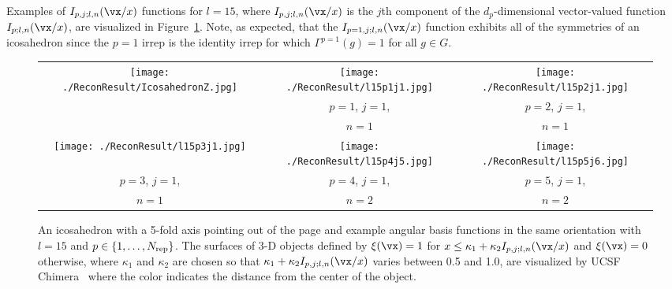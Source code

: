 \par
Examples of $I_{p,j;l,n}(\vx/x)$ functions for $l=15$, where
$I_{p,j;l,n}(\vx/x)$ is the $j$th component of the $d_p$-dimensional
vector-valued function $I_{p;l,n}(\vx/x)$, are visualized in
Figure~\ref{fig:irredrep}.
Note, as expected, that the $I_{p=1,j;l,n}(\vx/x)$ function exhibits all of
the symmetries of an icosahedron since the $p=1$ irrep is the identity
irrep for which $\Gamma^{p=1}(g)=1$ for all $g\in G$.
\begin{figure}[h!]
\begin{center}
\begin{tabular}{ccc}
\texttt{[image: ./ReconResult/IcosahedronZ.jpg]}
&
\texttt{[image: ./ReconResult/l15p1j1.jpg]}
&
\texttt{[image: ./ReconResult/l15p2j1.jpg]}
\\
&
$p=1$, $j=1$,
&
$p=2$, $j=1$,
\\
&
$n=1$
&
$n=1$
\\
\texttt{[image: ./ReconResult/l15p3j1.jpg]}
&
\texttt{[image: ./ReconResult/l15p4j5.jpg]}
&
\texttt{[image: ./ReconResult/l15p5j6.jpg]}
\\
$p=3$, $j=1$,
&
$p=4$, $j=1$,
&
$p=5$, $j=1$,
\\
$n=1$
&
$n=2$
&
$n=2$
\end{tabular}
\end{center}
\vspace*{-.1in}
\caption{
\label{fig:irredrep}
An icosahedron with a 5-fold axis pointing out of the page and example
angular basis functions in the same orientation with $l=15$ and
$p\in\{1,\dots,N_{\rm rep}\}$.
The surfaces of 3-D objects defined by $\xi(\vx)=1$ for $x\le
\kappa_1+\kappa_2 I_{p,j;l,n}(\vx/x)$ and $\xi(\vx)=0$ otherwise, where $\kappa_1$
and $\kappa_2$ are chosen so that
$\kappa_1+\kappa_2 I_{p,j;l,n}(\vx/x)$ varies between 0.5 and 1.0,
are visualized by UCSF
Chimera~\cite{PettersenHuangCouchGreenblattMengFerrin2004} where the color
indicates the distance from the center of the object.
}
\end{figure}
